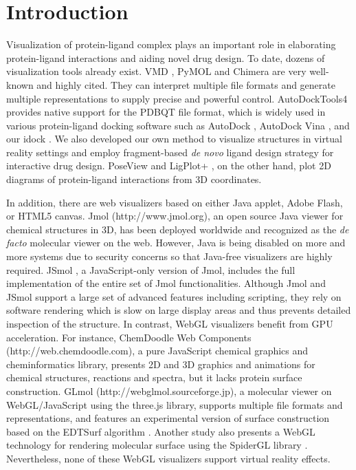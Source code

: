 \documentclass[twocolumn]{bmcart}%
\begin{document}
\section*{Introduction}
Visualization of protein-ligand complex plays an important role in elaborating protein-ligand interactions and aiding novel drug design. To date, dozens of visualization tools already exist. VMD \cite{1220}, PyMOL \cite{1221} and Chimera \cite{1219} are very well-known and highly cited. They can interpret multiple file formats and generate multiple representations to supply precise and powerful control. AutoDockTools4 \cite{596} provides native support for the PDBQT file format, which is widely used in various protein-ligand docking software such as AutoDock \cite{596}, AutoDock Vina \cite{595}, and our idock \cite{1153}. We also developed our own method \cite{1265} to visualize structures in virtual reality settings and employ fragment-based \textit{de novo} ligand design strategy for interactive drug design. PoseView \cite{748} and LigPlot+ \cite{951}, on the other hand, plot 2D diagrams of protein-ligand interactions from 3D coordinates.

In addition, there are web visualizers based on either Java applet, Adobe Flash, or HTML5 canvas. Jmol (http://www.jmol.org), an open source Java viewer for chemical structures in 3D, has been deployed worldwide and recognized as the \textit{de facto} molecular viewer on the web. However, Java is being disabled on more and more systems due to security concerns so that Java-free visualizers are highly required. JSmol \cite{1314}, a JavaScript-only version of Jmol, includes the full implementation of the entire set of Jmol functionalities. Although Jmol and JSmol support a large set of advanced features including scripting, they rely on software rendering which is slow on large display areas and thus prevents detailed inspection of the structure. In contrast, WebGL visualizers benefit from GPU acceleration. For instance, ChemDoodle Web Components (http://web.chemdoodle.com), a pure JavaScript chemical graphics and cheminformatics library, presents 2D and 3D graphics and animations for chemical structures, reactions and spectra, but it lacks protein surface construction. GLmol (http://webglmol.sourceforge.jp), a molecular viewer on WebGL/JavaScript using the three.js library, supports multiple file formats and representations, and features an experimental version of surface construction based on the EDTSurf algorithm \cite{1297,1350}. Another study \cite{1262} also presents a WebGL technology for rendering molecular surface using the SpiderGL library \cite{1320}. Nevertheless, none of these WebGL visualizers support virtual reality effects.
\end{document}

